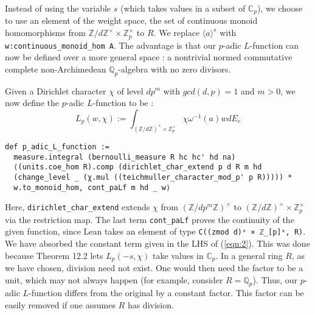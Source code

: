 \documentclass[a4paper,UKenglish,cleveref, autoref, thm-restate,pdfa]{lipics-v2021}
\newcommand{\lean}[1]{\texttt{#1}\xspace} %
\begin{document}
Instead of using the variable $s$ (which takes values in a subset of $\mathbb{C}_p$), we choose to use an element of the weight space, 
the set of continuous monoid homomorphisms from $\mathbb{Z}/d\mathbb{Z}^{\times} \times \mathbb{Z}_p^{\times}$ to $R$. We replace
$\langle a \rangle ^s$ with \lean{w:continuous\_monoid\_hom A}. The advantage is that our $p$-adic $L$-function can now be defined over a more general space : 
a nontrivial normed commutative complete non-Archimedean $\mathbb{Q}_p$-algebra with no zero divisors. 

Given a Dirichlet character $\chi$ of level $dp^m$ with $gcd(d, p) = 1$ and $m > 0$,
we now define the $p$-adic $L$-function to be : %
$$ L_p(w, \chi) := \int_{(\mathbb{Z}/d \mathbb{Z})^{\times} \times \mathbb{Z}_p^{\times}}
\chi \omega^{-1}(a) w dE_c $$
\begin{lstlisting}
def p_adic_L_function := 
  measure.integral (bernoulli_measure R hc hc' hd na)
  ⟨(units.coe_hom R).comp (dirichlet_char_extend p d R m hd 
  (change_level _ (χ.mul ((teichmuller_character_mod_p' p R))))) * 
  w.to_monoid_hom, cont_paLf m hd _ w⟩
\end{lstlisting}
Here, \lean{dirichlet\_char\_extend} extends $\chi$ from $(\mathbb{Z}/ dp^m \mathbb{Z})^{\times}$ to 
$(\mathbb{Z}/ d \mathbb{Z})^{\times} \times \mathbb{Z}_p^{\times}$ via the restriction map. The last term 
\lean{cont\_paLf} proves the continuity of the given function, since Lean takes an element of type \lean{C((zmod d)ˣ × ℤ\_[p]ˣ, R)}. 
We have absorbed the constant term given in the LHS of (\ref{eqn:2}). This was done because Theorem 12.2 
lets $L_p(-s, \chi)$ take values in $\mathbb{C}_p$. 
In a general ring $R$, as we have chosen, division need not exist. One would then need the factor to be a unit, which may not always happen 
(for example, consider $R = \mathbb{Q}_p$). Thus, our $p$-adic $L$-function differs from the original by a constant factor. 
This factor can be easily removed if one assumes $R$ has division. 

\end{document}
